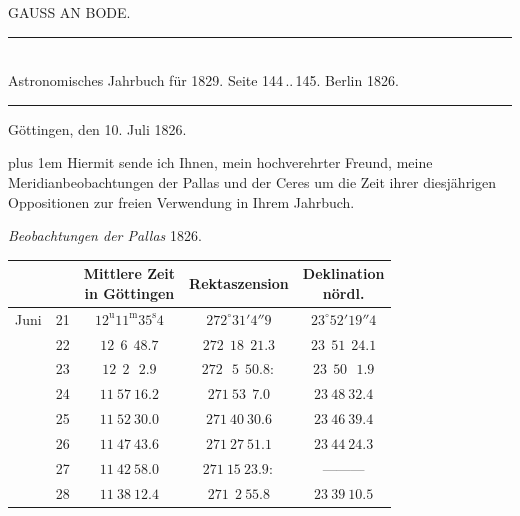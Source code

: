 \clearpage
{}
\hypertarget{native-459-bode}{}
\begin{center}{\large GAUSS AN BODE.}\end{center}

\begin{center}
\rule{0.55\linewidth}{0.4pt}\\[2pt]
Astronomisches Jahrbuch für 1829. Seite 144\,..\,145. Berlin 1826.\\[2pt]
\rule{0.55\linewidth}{0.4pt}
\end{center}

\begin{flushright}
Göttingen, den 10. Juli 1826.
\end{flushright}

\begingroup\rightskip=0pt plus 1em\relax
Hiermit sende ich Ihnen, mein hochverehrter Freund, meine Meridianbeobachtungen der Pallas und der Ceres um die Zeit ihrer diesjährigen Oppositionen zur freien Verwendung in Ihrem Jahrbuch.
\par\endgroup

\begin{center}
\emph{Beobachtungen der Pallas} 1826.
\end{center}

\begin{center}
\begingroup\small\setlength{\tabcolsep}{4pt}
\begin{tabular}{lr|c|c|c}
 & & \shortstack{Mittlere Zeit\\in Göttingen} & Rektaszension & \shortstack{Deklination\\nördl.} \\
\hline
Juni & 21 & $12^{\mathrm u}11^{\mathrm m}35^{\mathrm s}4$ & $272^\circ 31' 4''9$ & $23^\circ 52' 19''4$ \\
 & 22 & $12\ \ 6\ \ 48.7$ & $272\ \ 18\ \ 21.3$ & $23\ \ 51\ \ 24.1$ \\
 & 23 & $12\ \ 2\ \ \ 2.9$ & $272\ \ \ 5\ \ 50.8:$ & $23\ \ 50\ \ \ 1.9$ \\
 & 24 & $11\ 57\ 16.2$ & $271\ 53\ \ 7.0$ & $23\ 48\ 32.4$ \\
 & 25 & $11\ 52\ 30.0$ & $271\ 40\ 30.6$ & $23\ 46\ 39.4$ \\
 & 26 & $11\ 47\ 43.6$ & $271\ 27\ 51.1$ & $23\ 44\ 24.3$ \\
 & 27 & $11\ 42\ 58.0$ & $271\ 15\ 23.9:$ & ---\quad---\quad--- \\
 & 28 & $11\ 38\ 12.4$ & $271\ \ 2\ 55.8$ & $23\ 39\ 10.5$ \\
\end{tabular}
\endgroup
\end{center}

